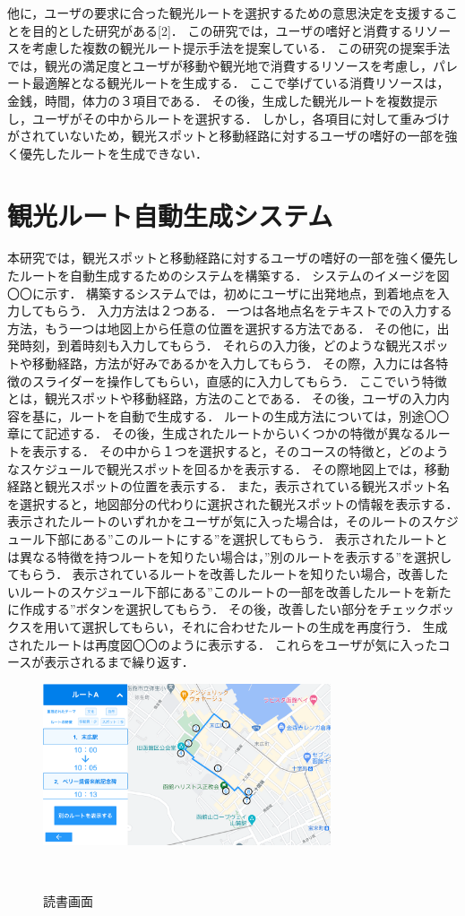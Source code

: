 他に，ユーザの要求に合った観光ルートを選択するための意思決定を支援することを目的とした研究がある[2]．
この研究では，ユーザの嗜好と消費するリソースを考慮した複数の観光ルート提示手法を提案している．
この研究の提案手法では，観光の満足度とユーザが移動や観光地で消費するリソースを考慮し，パレート最適解となる観光ルートを生成する．
ここで挙げている消費リソースは，金銭，時間，体力の３項目である．
その後，生成した観光ルートを複数提示し，ユーザがその中からルートを選択する．
しかし，各項目に対して重みづけがされていないため，観光スポットと移動経路に対するユーザの嗜好の一部を強く優先したルートを生成できない．

\section{観光ルート自動生成システム}\label{sec:観光ルート自動生成システム}
本研究では，観光スポットと移動経路に対するユーザの嗜好の一部を強く優先したルートを自動生成するためのシステムを構築する．
システムのイメージを図〇〇に示す．
構築するシステムでは，初めにユーザに出発地点，到着地点を入力してもらう．
入力方法は２つある．
一つは各地点名をテキストでの入力する方法，もう一つは地図上から任意の位置を選択する方法である．
その他に，出発時刻，到着時刻も入力してもらう．
それらの入力後，どのような観光スポットや移動経路，方法が好みであるかを入力してもらう．
その際，入力には各特徴のスライダーを操作してもらい，直感的に入力してもらう．
ここでいう特徴とは，観光スポットや移動経路，方法のことである．
その後，ユーザの入力内容を基に，ルートを自動で生成する．
ルートの生成方法については，別途〇〇章にて記述する．
その後，生成されたルートからいくつかの特徴が異なるルートを表示する．
その中から１つを選択すると，そのコースの特徴と，どのようなスケジュールで観光スポットを回るかを表示する．
その際地図上では，移動経路と観光スポットの位置を表示する．
また，表示されている観光スポット名を選択すると，地図部分の代わりに選択された観光スポットの情報を表示する．
表示されたルートのいずれかをユーザが気に入った場合は，そのルートのスケジュール下部にある”このルートにする”を選択してもらう．
表示されたルートとは異なる特徴を持つルートを知りたい場合は，”別のルートを表示する”を選択してもらう．
表示されているルートを改善したルートを知りたい場合，改善したいルートのスケジュール下部にある”このルートの一部を改善したルートを新たに作成する”ボタンを選択してもらう．
その後，改善したい部分をチェックボックスを用いて選択してもらい，それに合わせたルートの生成を再度行う．
生成されたルートは再度図〇〇のように表示する．
これらをユーザが気に入ったコースが表示されるまで繰り返す．
\begin{figure}[h]
  \begin{center}
  \includegraphics[width=8.5cm,bb=0 0 1980 1080]{sysimage1.png}
  \end{center}
  \caption{読書画面}　
  \label{fig:読書画面}
\end{figure}
